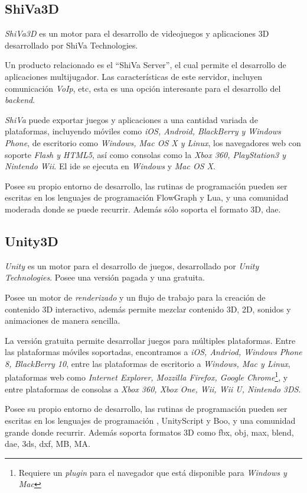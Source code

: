 \subsection{ShiVa3D}

\textit{ShiVa3D} es un motor para el desarrollo de videojuegos y aplicaciones 
3D desarrollado por ShiVa Technologies\cite{shiva}.

Un producto relacionado es el \enquote{ShiVa Server}, el cual permite el
desarrollo de aplicaciones multijugador. Las características de este servidor,
incluyen comunicación \textit{VoIp}, etc\cite{shiva}, esta es
una opción interesante para el desarrollo del \textit{backend}.

\textit{ShiVa} puede exportar juegos y aplicaciones a una cantidad variada de 
plataformas, incluyendo móviles como \textit{iOS, Android, BlackBerry y Windows
Phone}, de escritorio como \textit{Windows, Mac OS X y Linux}, los
navegadores web con soporte \textit{Flash y HTML5}, así como consolas como la
\textit{Xbox 360, PlayStation3 y Nintendo Wii}. El \Gls{ide} se ejecuta en
\textit{Windows} y \textit{Mac OS X}\cite{shiva}. 

Posee su propio entorno de desarrollo, las rutinas de programación pueden ser 
escritas en los lenguajes de programación FlowGraph y Lua, y una 
comunidad moderada donde se puede recurrir. Además sólo soporta el formato 
3D, dae\cite{shiva}.


\subsection{Unity3D}

\textit{Unity} es un motor para el desarrollo de juegos,
desarrollado por \textit{Unity Technologies}. Posee una versión pagada 
y una gratuita\cite{unity3d}.

Posee un motor de \textit{renderizado} y un flujo de trabajo para la creación 
de contenido 3D interactivo, además permite mezclar contenido 3D, 2D, sonidos 
y animaciones de manera sencilla\cite{unity3d}.

La versión gratuita permite desarrollar juegos para múltiples plataformas. 
Entre las plataformas móviles soportadas, encontramos a \textit{iOS, Andriod, 
Windows Phone 8, BlackBerry 10}, entre las plataformas de escritorio a 
\textit{Windows, Mac y Linux}, plataformas web como \textit{Internet Explorer,
    Mozzilla Firefox, Google Chrome}\footnote{Requiere un \textit{plugin} para
    el navegador que está disponible para \textit{Windows y Mac}}, y entre
plataformas de consolas a \textit{Xbox 360, Xbox One, Wii, Wii U, Nintendo
    3DS}\cite{unity3d}.

Posee su propio entorno de desarrollo, las rutinas de programación pueden ser 
escritas en los lenguajes de programación \cs{}, UnityScript y Boo, y una 
comunidad grande donde recurrir. Además soporta formatos 3D como fbx, obj, max, 
blend, dae, 3ds, dxf, MB, MA\cite{unity3d}.

